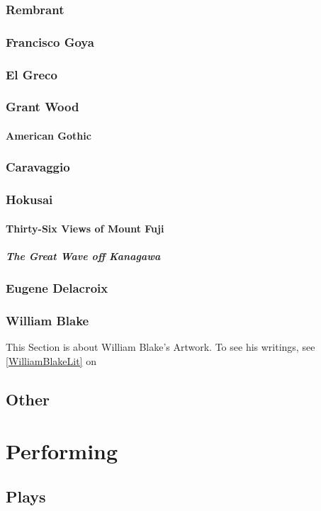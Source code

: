 			\subsubsection{Rembrant}
			\subsubsection{Francisco Goya}
			\subsubsection{El Greco}
			\subsubsection{Grant Wood}
				\paragraph{American Gothic}
			\subsubsection{Caravaggio}
			\subsubsection{Hokusai}
				\paragraph{Thirty-Six Views of Mount Fuji}
					\subparagraph{The Great Wave off Kanagawa}
			\subsubsection{Eugene Delacroix}
			\subsubsection{William Blake}
			\label{WilliamBlakeArt} This Section is about William Blake's Artwork.  To see his writings, see \ref{WilliamBlakeLit} on 
			
			
		\subsection{Other}

	\section{Performing}
		\subsection{Plays}
